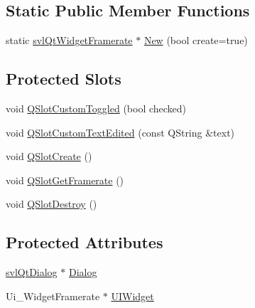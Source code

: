 \subsection*{Static Public Member Functions}
\begin{DoxyCompactItemize}
\item 
static \hyperlink{classsvl_qt_widget_framerate}{svl\-Qt\-Widget\-Framerate} $\ast$ \hyperlink{classsvl_qt_widget_framerate_ac6e8df71329947c02bd9fcb5a203d9fb}{New} (bool create=true)
\end{DoxyCompactItemize}
\subsection*{Protected Slots}
\begin{DoxyCompactItemize}
\item 
void \hyperlink{classsvl_qt_widget_framerate_aed76d7953edf20ba525495417a415493}{Q\-Slot\-Custom\-Toggled} (bool checked)
\item 
void \hyperlink{classsvl_qt_widget_framerate_ad6d6f1008d4bc878aa0cd710df3d54f9}{Q\-Slot\-Custom\-Text\-Edited} (const Q\-String \&text)
\item 
void \hyperlink{classsvl_qt_widget_framerate_a095e629724978a6b943b016ac9040f38}{Q\-Slot\-Create} ()
\item 
void \hyperlink{classsvl_qt_widget_framerate_aa81fead31d0456a43d59b271e43433b4}{Q\-Slot\-Get\-Framerate} ()
\item 
void \hyperlink{classsvl_qt_widget_framerate_ae5272c8d944b2a8728bd21cab3091436}{Q\-Slot\-Destroy} ()
\end{DoxyCompactItemize}
\subsection*{Protected Attributes}
\begin{DoxyCompactItemize}
\item 
\hyperlink{classsvl_qt_dialog}{svl\-Qt\-Dialog} $\ast$ \hyperlink{classsvl_qt_widget_framerate_afc4887261aa22c1ac02f67636a7f2210}{Dialog}
\item 
Ui\-\_\-\-Widget\-Framerate $\ast$ \hyperlink{classsvl_qt_widget_framerate_a40846f5133736383605f956be606b3c6}{U\-I\-Widget}
\end{DoxyCompactItemize}


